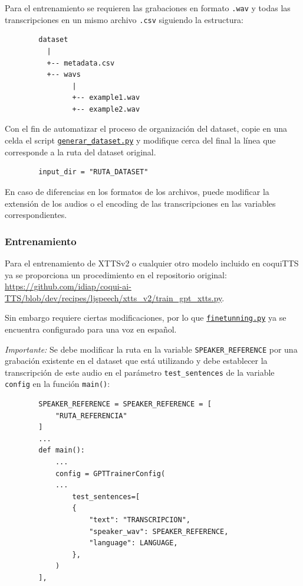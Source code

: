     Para el entrenamiento se requieren las grabaciones en formato \texttt{.wav} y todas las transcripciones en un mismo archivo \texttt{.csv} siguiendo la estructura:
    \begin{verbatim}
        dataset
          |
          +-- metadata.csv
          +-- wavs
                |
                +-- example1.wav
                +-- example2.wav
    \end{verbatim}

    Con el fin de automatizar el proceso de organización del dataset, copie en una celda el script \href{https://github.com/LSBR29/Procesamiento-de-Voces-TCU-748/blob/main/coquiTTS_Kaggle/generar_dataset.py}{\texttt{generar\_dataset.py}} y modifique cerca del final la línea que corresponde a la ruta del dataset original.
    \begin{verbatim}
        input_dir = "RUTA_DATASET"
    \end{verbatim}

    En caso de diferencias en los formatos de los archivos, puede modificar la extensión de los audios o el encoding de las transcripciones en las variables correspondientes.
    
    \subsubsection{Entrenamiento}
    Para el entrenamiento de XTTSv2 o cualquier otro modelo incluido en coquiTTS ya se proporciona un procedimiento en el repositorio original:
    \url{https://github.com/idiap/coqui-ai-TTS/blob/dev/recipes/ljspeech/xtts_v2/train_gpt_xtts.py}.

    Sin embargo requiere ciertas modificaciones, por lo que \href{https://github.com/LSBR29/Procesamiento-de-Voces-TCU-748/blob/main/coquiTTS_Kaggle/finetunning.py}{\texttt{finetunning.py}} ya se encuentra configurado para una voz en español.

    \textit{Importante:} Se debe modificar la ruta en la variable \texttt{SPEAKER\_REFERENCE} por una grabación existente en el dataset que está utilizando y debe establecer la transcripción de este audio en el parámetro \texttt{test\_sentences} de la variable \texttt{config} en la función \texttt{main()}:

    \begin{verbatim}
        SPEAKER_REFERENCE = SPEAKER_REFERENCE = [
            "RUTA_REFERENCIA"
        ]
        ...
        def main():
            ...
            config = GPTTrainerConfig(
            ...
                test_sentences=[
                {
                    "text": "TRANSCRIPCION",
                    "speaker_wav": SPEAKER_REFERENCE,
                    "language": LANGUAGE,
                },
            )
        ],
    \end{verbatim}

